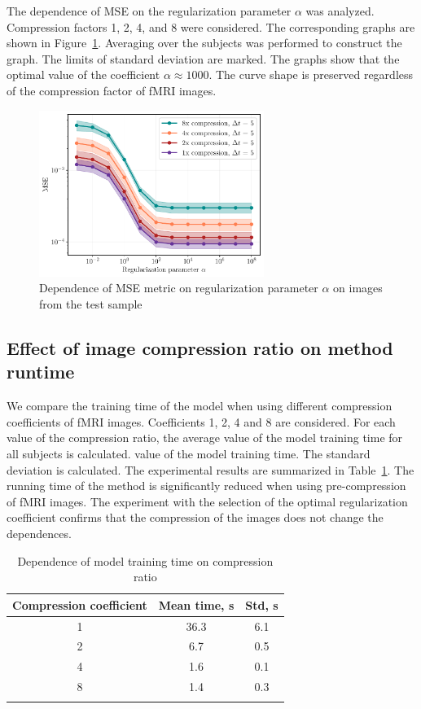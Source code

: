 \documentclass[sn-mathphys-num]{sn-jnl}%
\theoremstyle{thmstyleone}%
\theoremstyle{thmstyletwo}%
\theoremstyle{thmstylethree}%
\begin{document}
The dependence of MSE on the regularization parameter $\alpha$ was analyzed.
Compression factors 1, 2, 4, and 8 were considered.
The corresponding graphs are shown in Figure~\ref{fig:mse-alpha}.
Averaging over the subjects was performed to construct the graph.
The limits of standard deviation are marked.
The graphs show that the optimal value of the coefficient $\alpha \approx 1000$.
The curve shape is preserved regardless of the compression factor of fMRI images.

\begin{figure}[h!]
	\centering
	\includegraphics[width=0.65\textwidth]{subs_MSE_alpha.pdf}
	\caption{Dependence of MSE metric on regularization parameter $\alpha$ on images from the test sample}
	\label{fig:mse-alpha}
\end{figure}

\subsection{Effect of image compression ratio on method runtime}

We compare the training time of the model when using different
compression coefficients of fMRI images. Coefficients 1, 2, 4 and 8 are considered.
For each value of the compression ratio, the average value of the model training time for all subjects is calculated.
value of the model training time. The standard deviation is calculated.
The experimental results are summarized in Table~\ref{table:coeffs}.
The running time of the method is significantly reduced when using
pre-compression of fMRI images. 
The experiment with the selection of the optimal regularization coefficient
confirms that the compression of the images does not change the dependences.

\begin{table}[h!]
\caption{Dependence of model training time on compression ratio}\label{table:coeffs}
\begin{tabular}{@{}ccc@{}}
\toprule
Compression coefficient & Mean time, s & Std, s \\
\midrule
1 & 36.3 & 6.1 \\
2 & 6.7 & 0.5 \\
4 & 1.6 & 0.1 \\
8 & 1.4 & 0.3 \\
\botrule
\end{tabular}
\end{table}
\end{document}
